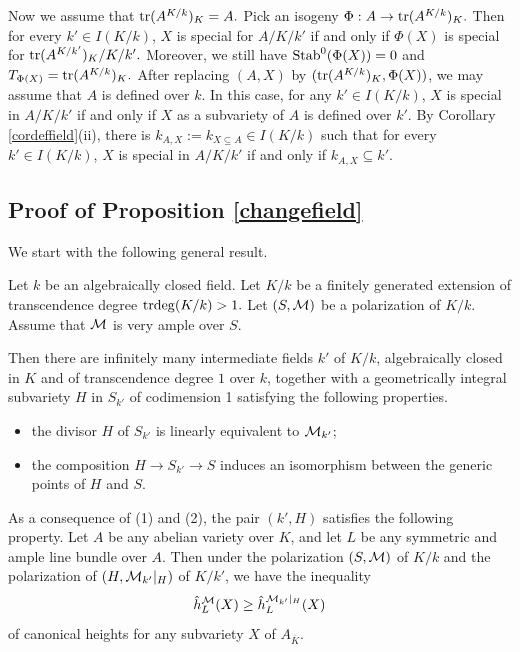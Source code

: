 \documentclass[12pt]{amsart}
\begin{document}
Now we assume that ${\rm tr}(A^{K/k})_K= A.$ Pick an isogeny $\Phi: A\to {\rm tr}(A^{K/k})_K.$ Then for every $k'\in I(K/k)$,  $X$ is special for $A/K/k'$ if and only if $\Phi(X)$ is special for ${\rm tr}(A^{K/k'})_K/K/k'.$
Moreover, we still have ${\mathrm{Stab}}^0(\Phi(X))=0$ and $T_{\Phi(X)}={\rm tr}(A^{K/k})_K.$
After replacing $(A, X)$ by $({\rm tr}(A^{K/k})_K, \Phi(X))$, we may assume that $A$ is defined over $k.$
In this case, for any $k'\in I(K/k)$, $X$ is special in $A/K/k'$ if and only if  $X$ as a subvariety of $A$ is defined over $k'.$
By Corollary \ref{cordeffield}(ii), there is $k_{A,X}:=k_{X\subseteq A}\in I(K/k)$ such that for every $k'\in I(K/k)$, $X$ is special in $A/K/k'$
if and only if $k_{A,X}\subseteq k'$.
\endproof




\subsection{Proof of Proposition \ref{changefield}}



We start with the following general result. 

\begin{lem}\label{generic hyperplane} 
Let $k$ be an algebraically closed field.
Let $K/k$ be a finitely generated extension of transcendence degree ${\mathrm{trdeg}}(K/k)>1.$
Let $(S,{\mathcal M})$ be a polarization of $K/k$.
Assume that ${\mathcal M}$ is very ample over $S$.

Then there are infinitely many intermediate fields $k'$ of $K/k$, algebraically closed in $K$ and of transcendence degree $1$ over $k$, together with a geometrically integral subvariety $H$ in $S_{k'}$ of codimension 1 satisfying the following properties.
\begin{itemize}
\item[(1)]
the divisor $H$ of $S_{k'}$ is linearly equivalent to ${\mathcal M}_{k'}$;
\item[(2)]
the composition $H\to S_{k'} \to S$ induces an isomorphism between the generic points of $H$ and $S$.
\end{itemize}

As a consequence of (1) and (2), the pair $(k',H)$ satisfies the following property.
Let $A$ be any abelian variety over $K$, and let $L$ be any symmetric and ample line bundle over $A$.
Then under the polarization $(S,{\mathcal M})$ of $K/k$ and the polarization of $(H, {\mathcal M}_{k'}|_H)$ of $K/k'$, we have the inequality 
$$
\hat h_L^{\mathcal M}(X)\geq \hat h_L^{{\mathcal M}_{k'}|_H}(X)
$$
of canonical heights for any subvariety $X$ of $A_{\overline{K}}.$
\end{lem}
\end{document}
